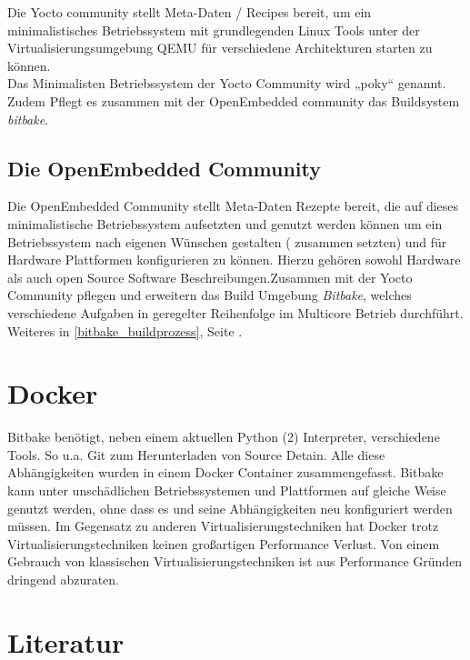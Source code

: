 Die Yocto community stellt Meta-Daten / Recipes bereit, um ein
minimalistisches Betriebssystem mit grundlegenden  Linux Tools unter der
Virtualisierungsumgebung QEMU für verschiedene Architekturen starten zu können.
\\

Das Minimalisten Betriebssystem der Yocto Community wird „poky“ genannt.
\\

Zudem Pflegt es zusammen mit der OpenEmbedded community das Buildsystem
\textit{bitbake}.

\subsection{Die OpenEmbedded Community}%
\label{sub:die_openembedded_community}


Die OpenEmbedded Community stellt Meta-Daten Rezepte bereit, die auf dieses
minimalistische Betriebssystem aufsetzten und genutzt werden können um ein
Betriebssystem nach eigenen Wünschen gestalten ( zusammen setzten) und für
Hardware Plattformen konfigurieren zu können. Hierzu gehören sowohl Hardware als
auch open Source Software Beschreibungen.Zusammen mit der Yocto Community
 pflegen und erweitern das Build Umgebung \textit{Bitbake}, welches
 verschiedene Aufgaben in geregelter Reihenfolge im Multicore Betrieb
 durchführt. Weiteres in \ref{bitbake_buildprozess}, Seite
 \pageref{bitbake_buildprozess}.




\section{Docker} \label{sec:docker}
Bitbake benötigt, neben einem aktuellen Python (2) Interpreter, verschiedene
Tools. So u.a. Git zum Herunterladen von Source Detain. Alle diese
Abhängigkeiten wurden in einem \gls{Docker} Container zusammengefasst. Bitbake
kann unter unschädlichen Betriebssystemen und Plattformen auf gleiche Weise
genutzt werden, ohne dass es und seine Abhängigkeiten neu konfiguriert werden
müssen.  Im Gegensatz zu anderen Virtualisierungstechniken hat Docker trotz
Virtualisierungstechniken keinen großartigen Performance Verlust.  Von einem
Gebrauch von klassischen Virtualisierungstechniken ist aus Performance Gründen
dringend abzuraten.


\section{Literatur}%
\label{sec:literatur}

